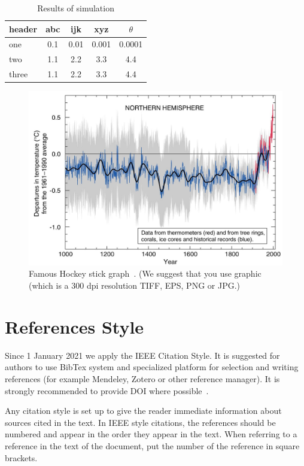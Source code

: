 \documentclass[10pt,twoside,twocolumn,a4paper]{article}
\begin{document}
\begin{table}
\caption{Results of simulation}
\label{tab:results}
\begin{tabular}{|l|c|c|c|c|}
\hline
header & abc & ijk & xyz & $\theta$ \\
\hline \hline
one & 0.1 & 0.01 & 0.001 & 0.0001\\ 
\hline
two & 1.1 & 2.2 & 3.3 & 4.4\\
\hline
three & 1.1 & 2.2 & 3.3 & 4.4\\
\hline
\end{tabular}
\end{table}


\begin{figure}
\begin{center}
\includegraphics[width=0.99\linewidth]{img/hockey.png} 
\end{center}
\caption{Famous Hockey stick graph~\cite{mann1999northern}. (We suggest that you use graphic (which is a 300 dpi resolution TIFF, EPS, PNG or JPG.) }
\label{fig:hockey}
\end{figure}

\section{References Style}
Since 1 January 2021 we apply the IEEE Citation Style.
It is suggested for authors to use BibTex system and specialized platform for selection and writing references (for example Mendeley, Zotero or other reference manager). It is strongly recommended to provide DOI where possible~\cite{stando2020constant}.

Any citation style is set up to give the reader immediate information about sources cited in the text. In IEEE style citations, the references should be numbered and appear in the order they appear in the text. When referring to a reference in the text of the document, put the number of the reference in square brackets. 
\end{document}
